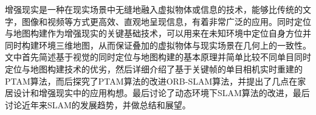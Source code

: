 \begin{cnabstract}
增强现实是一种在现实场景中无缝地融入虚拟物体或信息的技术，能够比传统的文字，图像和视频等方式更高效、直观地呈现信息，有着非常广泛的应用。同时定位与地图构建作为增强现实的关键基础技术，可以用来在未知环境中定位自身方位并同时构建环境三维地图，从而保证叠加的虚拟物体与现实场景在几何上的一致性。文中首先简述基于视觉的同时定位与地图构建的基本原理并简单比较不同单目同时定位与地图构建技术的优劣，然后详细介绍了基于关键帧的单目相机实时重建的PTAM算法，而后探究了PTAM算法的改进ORB-SLAM算法，并提出了几点在家居设计和增强现实中的应用构想。最后讨论了动态环境下SLAM算法的改进，最后讨论近年来SLAM的发展趋势，并做总结和展望。

\end{cnabstract}

%
